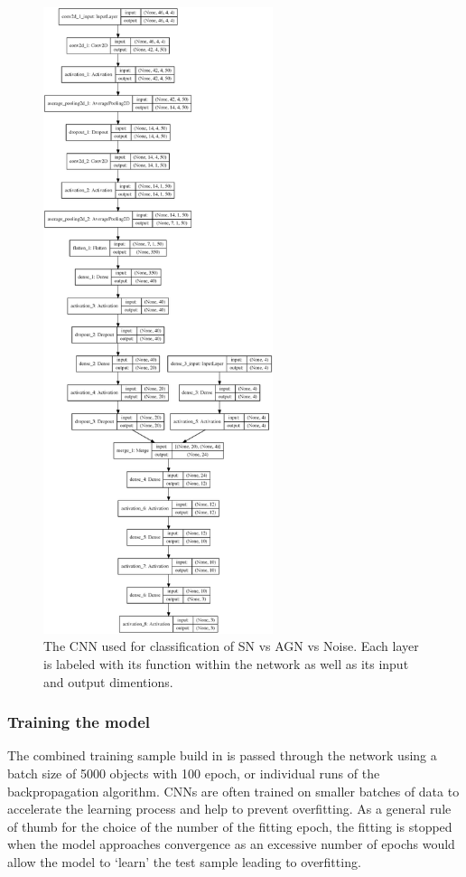 \begin{figure}
  \centering
  \includegraphics[width=0.6\textwidth]{Figures/Chapter5/SNAGNNoise}
  \caption{The CNN used for classification of SN vs AGN vs Noise. Each layer is labeled with its function within the network as well as its input and output dimentions.}
  \label{fig:AGNNoiseSNModel}
\end{figure}

\subsubsection{Training the model}
The combined training sample build in  is passed through the network using a batch size of 5000 objects with 100 epoch, or individual runs of the backpropagation algorithm. CNNs are often trained on smaller batches of data to accelerate the learning process and help to prevent overfitting. As a general rule of thumb for the choice of the number of the fitting epoch, the fitting is stopped when the model approaches convergence as an excessive number of epochs would allow the model to `learn' the test sample leading to overfitting.

